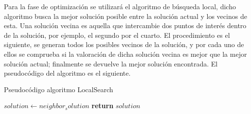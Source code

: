 \vspace{0.06in}
Para la fase de optimización se utilizará el algoritmo de búsqueda local, dicho algoritmo busca la mejor solución posible entre la solución actual y los vecinos de esta. Una solución vecina es aquella que intercambie dos puntos de interés dentro de la solución, por ejemplo, el segundo por el cuarto. El procedimiento es el siguiente, se generan todos los posibles vecinos de la solución, y por cada uno de ellos se comprueba si la valoración de dicha solución vecina es mejor que la mejor solución actual; finalmente se devuelve la mejor solución encontrada. El pseudocódigo del algoritmo es el siguiente.
\begin{algorithm}[H]
	\caption{Pseudocódigo algoritmo LocalSearch}
	\label{alg:local_search}
	\begin{algorithmic}
			\State $solution \gets neighbor_solution$
		\EndIf
		\EndFor
		\State \textbf{return} $solution$
		\EndFunction
	\end{algorithmic}
\end{algorithm}


